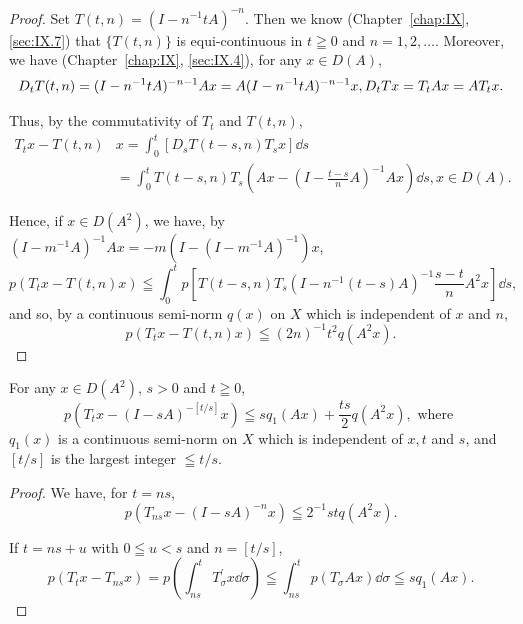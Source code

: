 \begin{proof}
 Set $T(t, n) = (I - n^{-1}tA)^{-n}$. Then we know (Chapter~\ref{chap:IX}, \ref{sec:IX.7}) that $\{T(t, n)\}$ is equi-continuous in $t \geqq 0$ and $n = 1, 2, \ldots$. Moreover, we have (Chapter~\ref{chap:IX}, \ref{sec:IX.4}), for any $x \in D(A)$, 
\begin{equation}D _{t} T (t, n) = (I - n ^{-1} t A) ^{-n-1} A x = A (I - n ^{-1} t A) ^{-n-1} x, D _{t} T x = T _{t} A x = A T _{t} x. \notag\end{equation}

Thus, by the commutativity of $T_{t}$ and $T(t, n)$, 
\begin{equation}\label{eq:IX.12.5}
\begin{aligned} T _{t} x - T (t, n) & x = \int_{0} ^{t} [ D _{s} T (t - s, n) T _{s} x ] \dd s \\ & = \int_{0} ^{t} T (t - s, n) T _{s} \left(A x - \left(I - \frac {t - s}{n} A\right) ^{-1} A x\right) \dd s, x \in D (A). \end{aligned}
\end{equation}

Hence, if $x \in D(A^2)$, we have, by $(I - m^{-1}A)^{-1}Ax = -m(I - (I - m^{-1}A)^{-1})x$, 
\[
p (T _{t} x - T (t, n) x) \leqq \int_{0} ^{t} p [ T (t - s, n) T _{s} (I - n ^{-1} (t - s) A) ^{-1} \frac {s - t}{n} A ^{2} x ] \dd s,
\]
and so, by a continuous semi-norm $q(x)$ on $X$ which is independent of $x$ and $n$, 
\[
p \left(T _{t} x - T (t, n) x\right) \leqq (2 n) ^{-1} t ^{2} q \left(A ^{2} x\right).
\]
\end{proof}

\begin{corollaryu} For any $x \in D(A^2)$, $s > 0$ and $t \geqq 0$, 
\begin{equation}\label{eq:IX.12.6}
p \left(T _{t} x - (I - s A) ^{-[t/s]} x\right) \leqq s q _{1} (A x) + \frac {t s}{2} q \left(A ^{2} x\right), \text{ where }
\end{equation}
$q_{1}(x)$ is a continuous semi-norm on $X$ which is independent of $x, t$ and $s$, and $[t / s]$ is the largest integer $\leqq t / s$. 
\end{corollaryu}

\begin{proof}
 We have, for $t = ns$, 
\[
p \left(T _{ns} x - (I - s A) ^{-n} x\right) \leqq 2 ^{-1} s t q \left(A ^{2} x\right). \]

If $t = ns + u$ with $0 \leqq u < s$ and $n = [t / s]$, 
\[
p \left(T _{t} x - T _{ns} x\right) = p \left(\int_{ns} ^{t} T _{\sigma} ^{\prime} x \dd \sigma\right) \leqq \int_{ns} ^{t} p \left(T _{\sigma} A x\right) \dd \sigma \leqq s q _{1} (A x).
\]
\end{proof}

